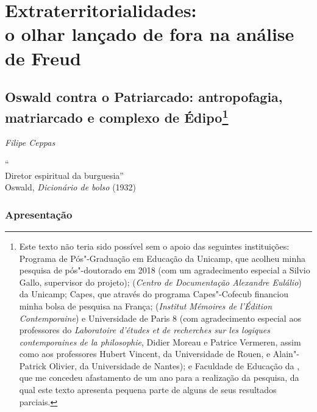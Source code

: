 \part{Extraterritorialidades:\\ o olhar lançado de fora na análise de Freud}

\chapter*{Oswald contra o Patriarcado: antropofagia, matriarcado e
complexo de Édipo\footnote{Este texto não teria sido possível sem o
  apoio das seguintes instituições: Programa de Pós"-Graduação em
  Educação da Unicamp, que acolheu minha pesquisa de pós"-doutorado em
  2018 (com um agradecimento especial a Silvio Gallo, supervisor do
  projeto);  (\emph{Centro de Documentação Alexandre Eulálio}) da
  Unicamp; Capes, que através do programa Capes"-Cofecub financiou minha
  bolsa de pesquisa na França;  (\emph{Institut Mémoires de
  l'Édition Contemporaine}) e Universidade de Paris 8 (com agradecimento
  especial aos professores do \emph{Laboratoire d'études et de
  recherches sur les logiques contemporaines de la philosophie}, Didier
  Moreau e Patrice Vermeren, assim como aos professores Hubert Vincent,
  da Universidade de Rouen, e Alain"-Patrick Olivier, da Universidade de
  Nantes); e Faculdade de Educação da , que me concedeu afastamento
  de um ano para a realização da pesquisa, da qual este texto apresenta
  pequena parte de alguns de seus resultados parciais.}}

\begin{flushright}
\emph{Filipe Ceppas}
\end{flushright}

\begin{flushright}
\footnotesize
``\\
Diretor espiritual da burguesia''\\
Oswald, \emph{Dicionário de bolso} (1932)
\end{flushright}

\section{Apresentação}

